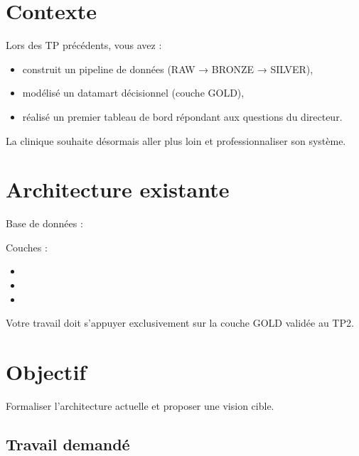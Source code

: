 \documentclass[11pt,a4paper]{article}
\begin{document}
\TPFrontPage


\section*{Contexte}

Lors des TP précédents, vous avez :

\begin{itemize}
  \item construit un pipeline de données (RAW → BRONZE → SILVER),
  \item modélisé un datamart décisionnel (couche GOLD),
  \item réalisé un premier tableau de bord répondant aux questions du directeur.
\end{itemize}

La clinique souhaite désormais aller plus loin et professionnaliser son système.

\section*{Architecture existante}

Base de données : 

Couches :

\begin{itemize}
  \item {}
  \item {}
  \item {}
\end{itemize}

Votre travail doit s'appuyer exclusivement sur la couche GOLD validée au TP2.


\section*{Objectif}

Formaliser l’architecture actuelle et proposer une vision cible.

\subsection*{Travail demandé}
\end{document}
